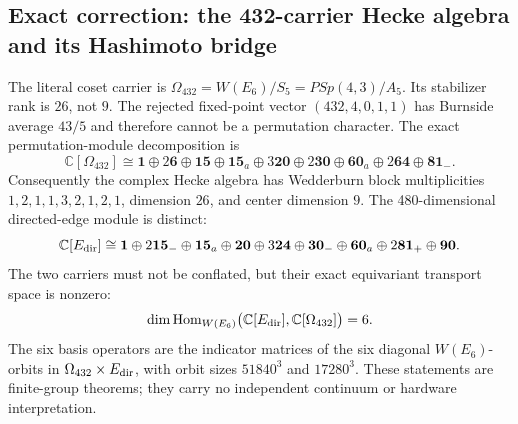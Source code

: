 \subsection{Exact correction: the 432-carrier Hecke algebra and its Hashimoto bridge}
The literal coset carrier is
\(\Omega_{432}=W(E_6)/S_5=PSp(4,3)/A_5\). Its stabilizer rank is
\(26\), not \(9\). The rejected fixed-point vector
\((432,4,0,1,1)\) has Burnside average \(43/5\) and therefore cannot be
a permutation character. The exact permutation-module decomposition is
\[
 \mathbb C[\Omega_{432}]
 \cong
 \mathbf 1\oplus2\mathbf 6\oplus\mathbf{15}\oplus\mathbf{15}_a
 \oplus3\mathbf{20}\oplus2\mathbf{30}\oplus\mathbf{60}_a
 \oplus2\mathbf{64}\oplus\mathbf{81}_{-}.
\]
Consequently the complex Hecke algebra has Wedderburn block multiplicities
\(1,2,1,1,3,2,1,2,1\), dimension \(26\), and center dimension \(9\).
The 480-dimensional directed-edge module is distinct:
\[
 \mathbb C[E_{\rm dir}]
 \cong
 \mathbf1\oplus2\mathbf{15}_{-}\oplus\mathbf{15}_a\oplus\mathbf{20}
 \oplus3\mathbf{24}\oplus\mathbf{30}_{-}\oplus\mathbf{60}_a
 \oplus2\mathbf{81}_{+}\oplus\mathbf{90}.
\]
The two carriers must not be conflated, but their exact equivariant transport
space is nonzero:
\[
 \dim\operatorname{Hom}_{W(E_6)}
 \bigl(\mathbb C[E_{\rm dir}],\mathbb C[\Omega_{432}]\bigr)=6.
\]
The six basis operators are the indicator matrices of the six diagonal
\(W(E_6)\)-orbits in \(\Omega_{432}\times E_{\rm dir}\), with orbit sizes
\(51840^3\) and \(17280^3\). These statements are finite-group theorems;
they carry no independent continuum or hardware interpretation.
